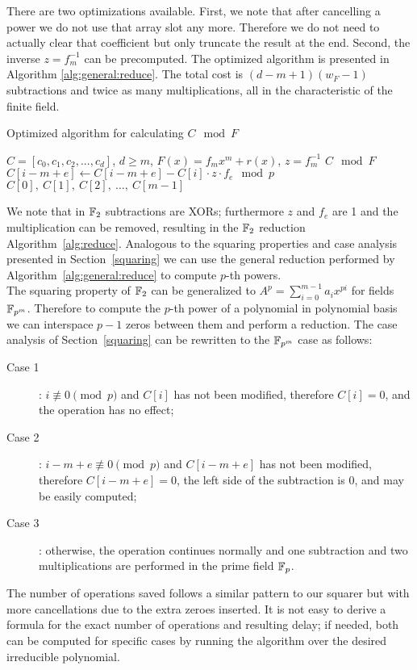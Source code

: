 There are two optimizations available. First, we note that after cancelling a power we do not use that array slot any more. Therefore we do not need to actually clear that coefficient but only truncate the result at the end. Second, the inverse $z = f_m^{-1}$ can be precomputed. The optimized algorithm is presented in Algorithm \ref{alg:general:reduce}. The total cost is $(d-m+1) (w_F-1)$ subtractions and twice as many multiplications, all in the characteristic of the finite field. \\

\begin{algorithm}
\caption{Optimized algorithm for calculating $C \mod F$}
\label{alg:general:reduce}
\begin{algorithmic}[1]
    \REQUIRE $C = [c_0, c_1, c_2, ..., c_d]$, $d \geq m$, $F(x) = f_m x^m + r(x)$, $z = f_m^{-1}$
    \ENSURE $C \mod F$
            \STATE $C[i-m+e] \leftarrow C[i-m+e] - C[i] \cdot z \cdot f_e \mod p$
        \ENDFOR
    \ENDFOR
    \RETURN $C[0],~C[1],~C[2],~\ldots,~C[m-1]$
\end{algorithmic}
\end{algorithm}

We note that in $\mathbb{F}_2$ subtractions are XORs; furthermore $z$ and $f_e$ are 1 and the multiplication can be removed, resulting in the $\mathbb{F}_2$ reduction Algorithm~\ref{alg:reduce}. Analogous to the squaring properties and case analysis presented in Section~\ref{squaring} we can use the general reduction performed by Algorithm~\ref{alg:general:reduce} to compute $p$-th powers. \\

The squaring property of $\mathbb{F}_2$ can be generalized to $A^p = \sum_{i=0}^{m-1} a_i x^{pi}$ for fields $\mathbb{F}_{p^m}$. Therefore to compute the $p$-th power of a polynomial in polynomial basis we can interspace $p-1$ zeros between them and perform a reduction. The case analysis of Section~\ref{squaring} can be rewritten to the $\mathbb{F}_{p^m}$ case as follows: \\

\begin{description}
\item[Case 1]: $i \not\equiv 0 \pmod{p}$ and $C[i]$ has not been modified, therefore $C[i] = 0$, and the operation has no effect;
\item[Case 2]: $i-m+e \not\equiv 0 \pmod{p}$ and $C[i-m+e]$ has not been modified, therefore $C[i-m+e] = 0$, the left side of the subtraction is $0$, and may be easily computed;
\item[Case 3]: otherwise, the operation continues normally and one subtraction and two multiplications are performed in the prime field $\mathbb{F}_p$.
\end{description}
    
The number of operations saved follows a similar pattern to our squarer but with more cancellations due to the extra zeroes inserted. It is not easy to derive a formula for the exact number of operations and resulting delay; if needed, both can be computed for specific cases by running the algorithm over the desired irreducible polynomial. \\